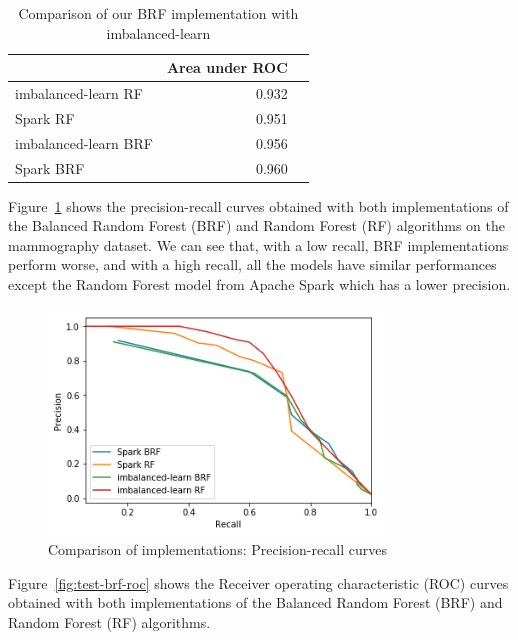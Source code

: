 \documentclass[conference]{IEEEtran}
\begin{document}
\begin{table}[htbp]
\caption{Comparison of our BRF implementation with imbalanced-learn}
\begin{center}
\begin{tabular}{|l|r|r|}
\cline{2-2}
\multicolumn{1}{c|}{} &  Area under ROC \\
\hline
imbalanced-learn RF  &   0.932 \\
Spark RF             &   0.951 \\
imbalanced-learn BRF &   0.956 \\
Spark BRF            &   0.960 \\
\hline
\end{tabular}
\label{table:test_brf_results}
\end{center}
\end{table}

Figure~\ref{fig:test-brf-precision-recall} shows the precision-recall curves obtained with both implementations of the Balanced Random Forest (BRF) and Random Forest (RF) algorithms on the mammography dataset. We can see that, with a low recall, BRF implementations perform worse, and with a high recall, all the models have similar performances except the Random Forest model from Apache Spark which has a lower precision.

\begin{figure}[htbp]
\centerline{\includegraphics[height=6cm, keepaspectratio]{Figures/test_brf_pr.png}}
\caption{Comparison of implementations: Precision-recall curves}
\label{fig:test-brf-precision-recall}
\end{figure}

Figure~\ref{fig:test-brf-roc} shows the Receiver operating characteristic (ROC) curves obtained with both implementations of the Balanced Random Forest (BRF) and Random Forest (RF) algorithms.
\end{document}
